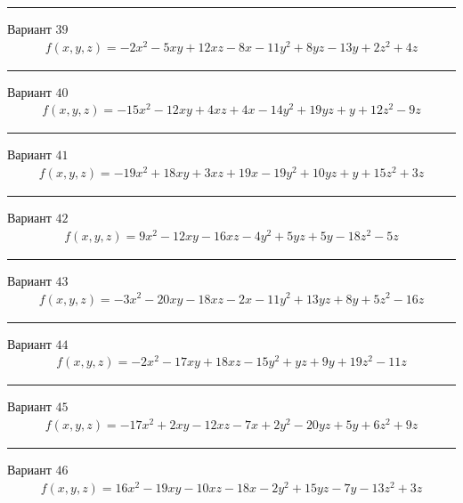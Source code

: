 \documentclass[11pt]{report}
\begin{document}
\begin{center}
\noindent\rule{8cm}{0.4pt}
\end{center}
Вариант $39$
\begin{align*}
    f(x, y, z) = - 2 x^{2} - 5 x y + 12 x z - 8 x - 11 y^{2} + 8 y z - 13 y + 2 z^{2} + 4 z
\end{align*}
\begin{center}
\noindent\rule{8cm}{0.4pt}
\end{center}
Вариант $40$
\begin{align*}
    f(x, y, z) = - 15 x^{2} - 12 x y + 4 x z + 4 x - 14 y^{2} + 19 y z + y + 12 z^{2} - 9 z
\end{align*}
\begin{center}
\noindent\rule{8cm}{0.4pt}
\end{center}
Вариант $41$
\begin{align*}
    f(x, y, z) = - 19 x^{2} + 18 x y + 3 x z + 19 x - 19 y^{2} + 10 y z + y + 15 z^{2} + 3 z
\end{align*}
\begin{center}
\noindent\rule{8cm}{0.4pt}
\end{center}
Вариант $42$
\begin{align*}
    f(x, y, z) = 9 x^{2} - 12 x y - 16 x z - 4 y^{2} + 5 y z + 5 y - 18 z^{2} - 5 z
\end{align*}
\begin{center}
\noindent\rule{8cm}{0.4pt}
\end{center}
Вариант $43$
\begin{align*}
    f(x, y, z) = - 3 x^{2} - 20 x y - 18 x z - 2 x - 11 y^{2} + 13 y z + 8 y + 5 z^{2} - 16 z
\end{align*}
\begin{center}
\noindent\rule{8cm}{0.4pt}
\end{center}
Вариант $44$
\begin{align*}
    f(x, y, z) = - 2 x^{2} - 17 x y + 18 x z - 15 y^{2} + y z + 9 y + 19 z^{2} - 11 z
\end{align*}
\begin{center}
\noindent\rule{8cm}{0.4pt}
\end{center}
Вариант $45$
\begin{align*}
    f(x, y, z) = - 17 x^{2} + 2 x y - 12 x z - 7 x + 2 y^{2} - 20 y z + 5 y + 6 z^{2} + 9 z
\end{align*}
\begin{center}
\noindent\rule{8cm}{0.4pt}
\end{center}
Вариант $46$
\begin{align*}
    f(x, y, z) = 16 x^{2} - 19 x y - 10 x z - 18 x - 2 y^{2} + 15 y z - 7 y - 13 z^{2} + 3 z
\end{align*}
\end{document}
